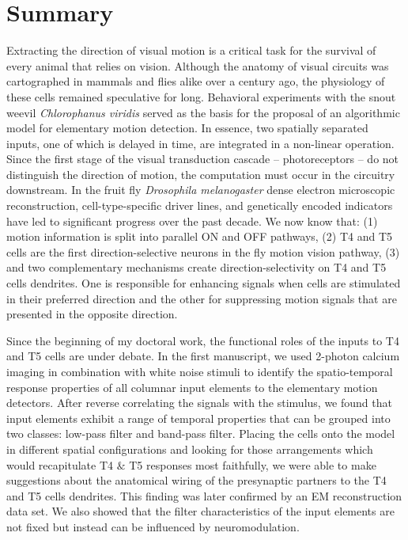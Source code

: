 
\begingroup
\let\clearpage\relax
\let\cleardoublepage\relax
\let\cleardoublepage\relax

\chapter*{Summary}


Extracting the direction of visual motion is a critical task for the survival of every animal that relies on vision. Although the anatomy of visual circuits was cartographed in mammals and flies alike over a century ago, the physiology of these cells remained speculative for long. Behavioral experiments with the snout weevil \textit{Chlorophanus viridis} served as the basis for the proposal of an algorithmic model for elementary motion detection. In essence, two spatially separated inputs, one of which is delayed in time, are integrated in a non-linear operation. Since the first stage of the visual transduction cascade -- photoreceptors -- do not distinguish the direction of motion, the computation must occur in the circuitry downstream. In the fruit fly \textit{Drosophila melanogaster} dense electron microscopic reconstruction, cell-type-specific driver lines, and genetically encoded indicators have led to significant progress over the past decade. We now know that: (1) motion information is split into parallel ON and OFF pathways, (2) T4 and T5 cells are the first direction-selective neurons in the fly motion vision pathway, (3) and two complementary mechanisms create direction-selectivity on T4 and T5 cells dendrites. One is responsible for enhancing signals when cells are stimulated in their preferred direction and the other for suppressing motion signals that are presented in the opposite direction.

Since the beginning of my doctoral work, the functional roles of the inputs to T4 and T5 cells are under debate. In the first manuscript, we used 2-photon calcium imaging in combination with white noise stimuli to identify the spatio-temporal response properties of all columnar input elements to the elementary motion detectors. After reverse correlating the signals with the stimulus, we found that input elements exhibit a range of temporal properties that can be grouped into two classes: low-pass filter and band-pass filter. Placing the cells onto the model in different spatial configurations and looking for those arrangements which would recapitulate T4 $\&$ T5 responses most faithfully, we were able to make suggestions about the anatomical wiring of the presynaptic partners to the T4 and T5 cells dendrites. This finding was later confirmed by an EM reconstruction data set. We also showed that the filter characteristics of the input elements are not fixed but instead can be influenced by neuromodulation. 

